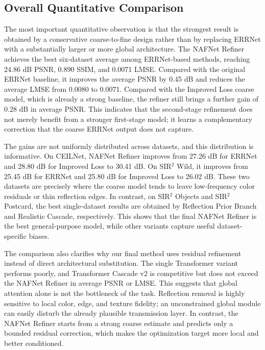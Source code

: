 \subsection{Overall Quantitative Comparison}

The most important quantitative observation is that the strongest result is obtained by a conservative coarse-to-fine design rather than by replacing ERRNet with a substantially larger or more global architecture. The NAFNet Refiner achieves the best six-dataset average among ERRNet-based methods, reaching 24.86 dB PSNR, 0.890 SSIM, and 0.0071 LMSE. Compared with the original ERRNet baseline, it improves the average PSNR by 0.45 dB and reduces the average LMSE from 0.0080 to 0.0071. Compared with the Improved Loss coarse model, which is already a strong baseline, the refiner still brings a further gain of 0.28 dB in average PSNR. This indicates that the second-stage refinement does not merely benefit from a stronger first-stage model; it learns a complementary correction that the coarse ERRNet output does not capture.

The gains are not uniformly distributed across datasets, and this distribution is informative. On CEILNet, NAFNet Refiner improves from 27.26 dB for ERRNet and 28.80 dB for Improved Loss to 30.41 dB. On SIR$^2$ Wild, it improves from 25.45 dB for ERRNet and 25.80 dB for Improved Loss to 26.02 dB. These two datasets are precisely where the coarse model tends to leave low-frequency color residuals or thin reflection edges. In contrast, on SIR$^2$ Objects and SIR$^2$ Postcard, the best single-dataset results are obtained by Reflection Prior Branch and Realistic Cascade, respectively. This shows that the final NAFNet Refiner is the best general-purpose model, while other variants capture useful dataset-specific biases.

The comparison also clarifies why our final method uses residual refinement instead of direct architectural substitution. The single Transformer variant performs poorly, and Transformer Cascade v2 is competitive but does not exceed the NAFNet Refiner in average PSNR or LMSE. This suggests that global attention alone is not the bottleneck of the task. Reflection removal is highly sensitive to local color, edge, and texture fidelity; an unconstrained global module can easily disturb the already plausible transmission layer. In contrast, the NAFNet Refiner starts from a strong coarse estimate and predicts only a bounded residual correction, which makes the optimization target more local and better conditioned.

